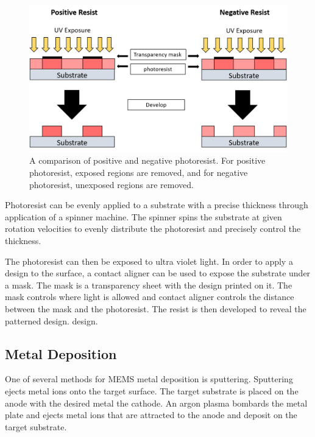  \begin{figure}[h]
     \centering
     \includegraphics[width=\textwidth]{images/negative_vs_positive_resist.png}
     \caption[A comparison of positive and negative photoresist]{A comparison of positive and negative photoresist. For positive photoresist, exposed regions are removed, and for negative photoresist, unexposed regions are removed.}
     \label{fig:negative_vs_positive_resist}
 \end{figure}
 
 \par Photoresist can be evenly applied to a substrate with a precise thickness through application of a spinner machine. The spinner spins the substrate at given rotation velocities to evenly distribute the photoresist and precisely control the thickness. 
 
 \par The photoresist can then be exposed to ultra violet light. In order to apply a design to the surface, a contact aligner can be used to expose the substrate under a mask. The mask is a transparency sheet with the design printed on it. The mask controls where light is allowed and contact aligner controls the distance between the mask and the photoresist. The resist is then developed to reveal the patterned design. design. 
 
 \subsection*{Metal Deposition}
 
 \par One of several methods for MEMS metal deposition is sputtering. Sputtering ejects metal ions onto the target surface. The target substrate is placed on the anode with the desired metal the cathode. An argon plasma bombards the metal plate and ejects metal ions that are attracted to the anode and deposit on the target substrate. 
 
